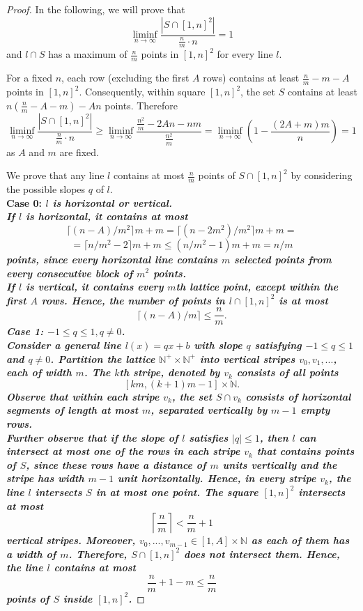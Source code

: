 \documentclass[11pt,a4paper]{article}
\numberwithin{equation}{section}
\newcommand{\nn}{\mathbb{N}}
\begin{document}
\begin{proof}
\noindent
In the following, we will prove that $$\displaystyle\liminf_{n\to\infty} \frac{|S\cap [1,n]^2|}{\frac{n}{m}\cdot n} = 1$$
and $l\cap S$ has a maximum of $\frac{n}{m}$ points in $[1,n]^2$ for every line $l$.

   For a fixed $n$, each row (excluding the first $A$ rows) contains at least $\frac n m-m-A$ points in $[1,n]^2$. Consequently, within square $[1, n]^2$, the set $S$ contains at least $n\left(\frac{n}{m} - A-m\right)-An$ points. Therefore
   $$\liminf_{n\to \infty} \frac{|S\cap [1,n]^2|}{\frac{n}{m}\cdot n} \ge \liminf_{n\to \infty} \frac{\frac{n^2}{m} - 2An-nm}{\frac{n^2}{m}}=\liminf_{n\to \infty}\left(1-\frac{(2A+m)m}{n}\right)=1$$
   as $A$ and $m$ are fixed.



We prove that any line $l$ contains at most $\frac{n}{m}$ points of $S\cap [1,n]^2$ by considering the possible slopes $q$ of $l$.
\\
\noindent
\bf Case 0: \it $l$ is horizontal or vertical. \rm \\
If $l$ is horizontal, it contains at most $$\lceil(n-A) /m^2\rceil m  + m=\lceil(n-2m^2) /m^2\rceil m  + m= $$
    $$=\lceil n /m^2 - 2\rceil m  +m\le \left( n/m^2-1\right) m + m=n/m$$
    points, since every horizontal line contains $m$ selected points from every consecutive block of $m^2$ points.\\
    If $l$ is vertical, it contains every $m$th lattice point, except within the first $A$ rows. Hence, the number of points in $l\cap [1,n]^2$ is at most
    $$\lceil (n-A)/m\rceil\le \frac{n}{m}.$$
\bf Case 1: $-1\le q\le 1, q\not =0$. \\
\rm Consider a general line  $l(x) = qx +b$ with slope $q$ satisfying $-1\le q\le 1$ and $q\not=0$. 
Partition the lattice $\nn^+\times\nn^+$ into vertical stripes $v_0,v_1, ...$, each of width $m$. The $k$th stripe, denoted by $v_k$ consists of all points $$[km, (k+1)m-1]\times\nn.$$ 
Observe that within each stripe $v_k$, the set $S\cap v_k$ consists of horizontal segments of length at most $m$, separated vertically by $m-1$ empty rows.\\
Further observe that if the slope of $l$ satisfies $|q|\le 1$, then $l$ can intersect at most one of the rows in each stripe $v_k$ that contains points of $S$, since these rows have a distance of $m$ units vertically and the stripe has width $m-1$ unit horizontally. Hence, in every stripe $v_k$, the line $l$ intersects $S$ in at most one point. The square $[1,n]^2$ intersects at most $$\left \lceil\frac{n}{m}\right \rceil<\frac{n}{m}+1$$ vertical stripes. Moreover, $v_0, ..., v_{m-1}\in[1, A]\times \nn$ as each of them has a width of $m$. Therefore, $S\cap [1,n]^2$ does not intersect them. Hence, the line $l$ contains at most $$\frac{n}{m}+1-m\le\frac{n}{m}$$ points of $S$ inside $[1,n]^2$.

\end{proof}
\end{document}
